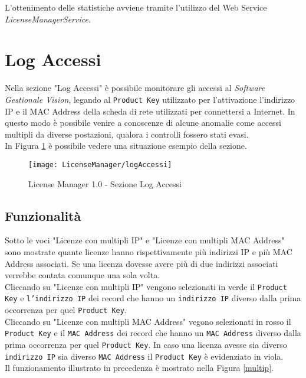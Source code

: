 L'ottenimento delle statistiche avviene tramite l'utilizzo del Web Service \textit{LicenseManagerService}.

\section{Log Accessi}

Nella sezione "Log Accessi" è possibile monitorare gli accessi al \textit{Software Gestionale Vision}, legando al \texttt{Product Key} utilizzato per l’attivazione l’indirizzo IP e il MAC Address della scheda di rete utilizzati per connettersi a Internet. In questo modo è possibile venire a conoscenze di alcune anomalie come accessi multipli da diverse postazioni, qualora i controlli fossero stati evasi.\\
In Figura \ref{accessi} è possibile vedere una situazione esempio della sezione.
\begin{figure}[!h] 
    \centering 
    \texttt{[image: LicenseManager/logAccessi]} 
    \caption{License Manager 1.0 - Sezione Log Accessi}
\label{accessi}

\end{figure}

\subsection{Funzionalità}

Sotto le voci "Licenze con multipli IP" e "Licenze con multipli MAC Address" sono mostrate quante licenze hanno rispettivamente più indirizzi IP e più MAC Address associati.
Se una licenza dovesse avere più di due indirizzi associati verrebbe contata comunque una sola volta.\\
Cliccando su "Licenze con multipli IP" vengono selezionati in verde il \texttt{Product Key} e \texttt{l’indirizzo IP} dei record che hanno un \texttt{indirizzo IP} diverso dalla prima occorrenza per quel \texttt{Product Key}.\\
Cliccando su "Licenze con multipli MAC Address" vegono selezionati in rosso il \texttt{Product Key} e il \texttt{MAC Address} dei record che hanno un \texttt{MAC Address} diverso dalla prima occorrenza per quel \texttt{Product Key}.
In caso una licenza avesse sia diverso \texttt{indirizzo IP} sia diverso \texttt{MAC Address} il \texttt{Product Key} è evidenziato in viola.\\
Il funzionamento illustrato in precedenza è mostrato nella Figura \ref{multip}.


